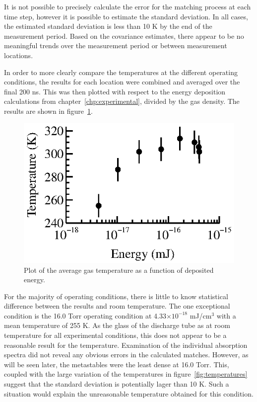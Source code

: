 It is not possible to precisely calculate the error for the matching process at
each time step, however it is possible to estimate the standard deviation. In
all cases, the estimated standard deviation is less than 10 K by the end of the
measurement period. Based on the covariance estimates, there appear to be no
meaningful trends over the measurement period or between measurement locations.

In order to more clearly compare the temperatures at the different operating
conditions, the results for each location were combined and averaged over the
final 200 ns. This was then plotted with respect to the energy deposition
calculations from chapter~\ref{chp:experimental}, divided by the gas density.
The results are shown in figure~\ref{fig:tvp}.
\begin{figure}
  \centering
  \includegraphics{./chapters/metastables/figures/tvp.eps}
  \caption{Plot of the average gas temperature as a function of deposited
  energy.}
  \label{fig:tvp}
\end{figure}
For the majority of operating conditions, there is little to know statistical
difference between the results and room temperature. The one exceptional
condition is the 16.0 Torr operating condition at 4.33$\times10^{-18}$
mJ/cm$^3$ with a mean temperature of 255 K. As the glass of the discharge tube
as at room temperature for all experimental conditions, this does not appear to
be a reasonable result for the temperature. Examination of the individual
absorption spectra did not reveal any obvious errors in the calculated matches.
However, as will be seen later, the metastables were the least dense at 16.0
Torr. This, coupled with the large variation of the temperatures in
figure~\ref{fig:temperatures} suggest that the standard deviation is potentially
lager than 10 K. Such a situation would explain the unreasonable temperature
obtained for this condition.

